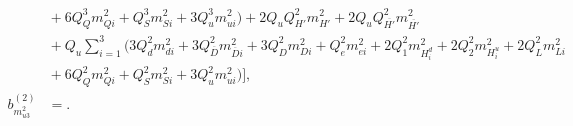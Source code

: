 \documentclass[preprint,amsmath,amssymb,aps,superscriptaddress,prd,showpacs,floatfix,nofootinbib]{revtex4-1}
\begin{document}
\begin{subequations}
\begin{align}
&{}+6Q_Q^3m_{Qi}^2+Q_S^3m_{Si}^2+3Q_u^3m_{ui}^2\big )+2Q_uQ_{H'}^2m_{H'}^2+2Q_uQ_{\overline{H'}}^2m_{\overline{H'}}^2\nonumber\\
&{}+Q_u\sum_{i=1}^3\big ( 3Q_d^2m_{di}^2+3Q_{\overline{D}}^2m_{\overline{D}i}^2+3Q_D^2m_{Di}^2+Q_e^2m_{ei}^2+2Q_1^2m_{H_i^d}^2+2Q_2^2m_{H_i^u}^2+2Q_L^2m_{Li}^2\nonumber\\
&{}+6Q_Q^2m_{Qi}^2+Q_S^2m_{Si}^2+3Q_u^2m_{ui}^2\big )\bigg ],\label{eq:USSMmu222BetaTwoLoop}\\
b_{m_{u3}^2}^{(2)}&=.\label{eq:USSMmu222Ot2Coeff}
\end{align}
\end{subequations}

{}
\end{document}
